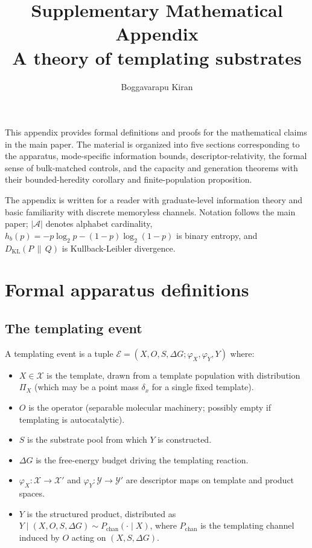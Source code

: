\documentclass[11pt]{article}
\title{Supplementary Mathematical Appendix\\
\large A theory of templating substrates}
\author{Boggavarapu Kiran}
\date{}
\theoremstyle{plain}
\theoremstyle{definition}
\newcommand{\Hbin}{h_b}
\newcommand{\descX}{\varphi_X}
\newcommand{\descY}{\varphi_Y}
\newcommand{\KL}[2]{D_{\mathrm{KL}}\!\left(#1 \,\|\, #2\right)}
\begin{document}
\maketitle

\noindent
This appendix provides formal definitions and proofs for the mathematical claims in the main paper. The material is organized into five sections corresponding to the apparatus, mode-specific information bounds, descriptor-relativity, the formal sense of bulk-matched controls, and the capacity and generation theorems with their bounded-heredity corollary and finite-population proposition.

The appendix is written for a reader with graduate-level information theory \citep{CoverThomas2006} and basic familiarity with discrete memoryless channels. Notation follows the main paper; $|\mathcal{A}|$ denotes alphabet cardinality, $\Hbin(p) = -p \log_2 p - (1-p) \log_2 (1-p)$ is binary entropy, and $\KL{P}{Q}$ is Kullback-Leibler divergence.

\tableofcontents
\bigskip

\section{Formal apparatus definitions}

\subsection{The templating event}

A templating event is a tuple $\mathcal{E} = (X, O, S, \Delta G; \descX, \descY, Y)$ where:
\begin{itemize}
  \item $X \in \mathcal{X}$ is the template, drawn from a template population with distribution $\Pi_X$ (which may be a point mass $\delta_x$ for a single fixed template).
  \item $O$ is the operator (separable molecular machinery; possibly empty if templating is autocatalytic).
  \item $S$ is the substrate pool from which $Y$ is constructed.
  \item $\Delta G$ is the free-energy budget driving the templating reaction.
  \item $\descX: \mathcal{X} \to \mathcal{X}'$ and $\descY: \mathcal{Y} \to \mathcal{Y}'$ are descriptor maps on template and product spaces.
  \item $Y$ is the structured product, distributed as $Y \mid (X, O, S, \Delta G) \sim P_{\mathrm{chan}}(\cdot \mid X)$, where $P_{\mathrm{chan}}$ is the templating channel induced by $O$ acting on $(X, S, \Delta G)$.
\end{itemize}
\end{document}
